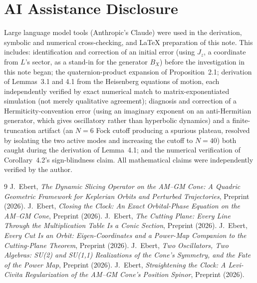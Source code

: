 \documentclass[12pt]{amsart}
\theoremstyle{plain}
\theoremstyle{remark}
\begin{document}
\section*{AI Assistance Disclosure}

Large language model tools (Anthropic's Claude) were used in the derivation, symbolic and numerical cross-checking, and \LaTeX{} preparation of this note. This includes: identification and correction of an initial error (using $J_z$, a coordinate from $L$'s sector, as a stand-in for the generator $B_X$) before the investigation in this note began; the quaternion-product expansion of Proposition~2.1; derivation of Lemmas~3.1 and 4.1 from the Heisenberg equations of motion, each independently verified by exact numerical match to matrix-exponentiated simulation (not merely qualitative agreement); diagnosis and correction of a Hermiticity-convention error (using an imaginary exponent on an anti-Hermitian generator, which gives oscillatory rather than hyperbolic dynamics) and a finite-truncation artifact (an $N=6$ Fock cutoff producing a spurious plateau, resolved by isolating the two active modes and increasing the cutoff to $N=40$) both caught during the derivation of Lemma~4.1; and the numerical verification of Corollary~4.2's sign-blindness claim. All mathematical claims were independently verified by the author.

\begin{thebibliography}{9}
 J.~Ebert, \emph{The Dynamic Slicing Operator on the AM--GM Cone: A Quadric Geometric Framework for Keplerian Orbits and Perturbed Trajectories}, Preprint (2026).
 J.~Ebert, \emph{Closing the Clock: An Exact Orbital-Phase Equation on the AM--GM Cone}, Preprint (2026).
 J.~Ebert, \emph{The Cutting Plane: Every Line Through the Multiplication Table Is a Conic Section}, Preprint (2026).
 J.~Ebert, \emph{Every Cut Is an Orbit: Eigen-Coordinates and a Power-Map Companion to the Cutting-Plane Theorem}, Preprint (2026).
 J.~Ebert, \emph{Two Oscillators, Two Algebras: SU(2) and SU(1,1) Realizations of the Cone's Symmetry, and the Fate of the Power Map}, Preprint (2026).
 J.~Ebert, \emph{Straightening the Clock: A Levi-Civita Regularization of the AM--GM Cone's Position Spinor}, Preprint (2026).
\end{thebibliography}
\end{document}

